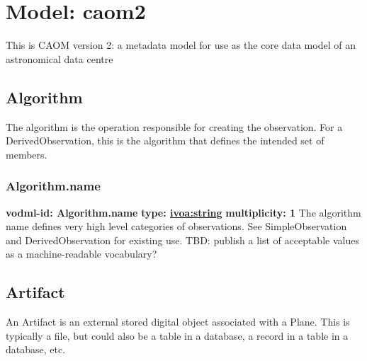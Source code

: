 
%



    
    

\pagebreak
\section{Model: caom2 }
  

  This is CAOM version 2: a metadata model for use as the core data model of an astronomical data centre

  \subsection{Algorithm}
  \label{sect:Algorithm}
    The algorithm is the operation responsible for creating the observation. For a DerivedObservation, this is the algorithm that defines the intended set of members.

    \subsubsection{Algorithm.name}
      \textbf{vodml-id: Algorithm.name} \newline
      \textbf{type: \hyperref[sect:ivoa]{ivoa:string}} \newline
      \textbf{multiplicity: 1} \newline
      The algorithm name defines very high level categories of observations. See SimpleObservation and DerivedObservation for existing use. TBD: publish a list of acceptable values as a machine-readable vocabulary?

  \subsection{Artifact}
  \label{sect:Artifact}
    An Artifact is an external stored digital object associated with a Plane. This is typically a file, but could also be a table in a database, a record in a table in a database, etc.

